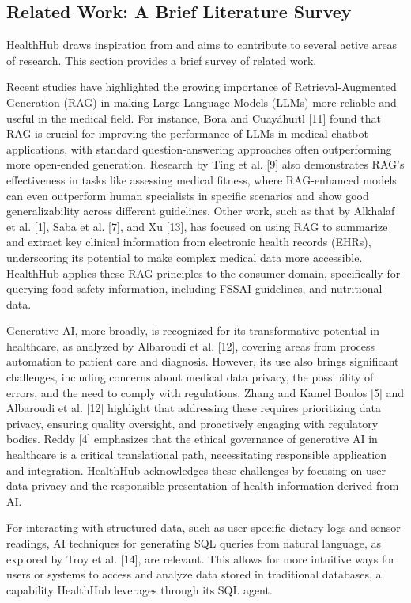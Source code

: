 \subsection{Related Work: A Brief Literature Survey}
HealthHub draws inspiration from and aims to contribute to several active areas of research. This section provides a brief survey of related work.

Recent studies have highlighted the growing importance of Retrieval-Augmented Generation (RAG) in making Large Language Models (LLMs) more reliable and useful in the medical field. For instance, Bora and Cuayáhuitl [11] found that RAG is crucial for improving the performance of LLMs in medical chatbot applications, with standard question-answering approaches often outperforming more open-ended generation. Research by Ting et al. [9] also demonstrates RAG's effectiveness in tasks like assessing medical fitness, where RAG-enhanced models can even outperform human specialists in specific scenarios and show good generalizability across different guidelines. Other work, such as that by Alkhalaf et al. [1], Saba et al. [7], and Xu [13], has focused on using RAG to summarize and extract key clinical information from electronic health records (EHRs), underscoring its potential to make complex medical data more accessible. HealthHub applies these RAG principles to the consumer domain, specifically for querying food safety information, including FSSAI guidelines, and nutritional data.

Generative AI, more broadly, is recognized for its transformative potential in healthcare, as analyzed by Albaroudi et al. [12], covering areas from process automation to patient care and diagnosis. However, its use also brings significant challenges, including concerns about medical data privacy, the possibility of errors, and the need to comply with regulations. Zhang and Kamel Boulos [5] and Albaroudi et al. [12] highlight that addressing these requires prioritizing data privacy, ensuring quality oversight, and proactively engaging with regulatory bodies. Reddy [4] emphasizes that the ethical governance of generative AI in healthcare is a critical translational path, necessitating responsible application and integration. HealthHub acknowledges these challenges by focusing on user data privacy and the responsible presentation of health information derived from AI.

For interacting with structured data, such as user-specific dietary logs and sensor readings, AI techniques for generating SQL queries from natural language, as explored by Troy et al. [14], are relevant. This allows for more intuitive ways for users or systems to access and analyze data stored in traditional databases, a capability HealthHub leverages through its SQL agent.

